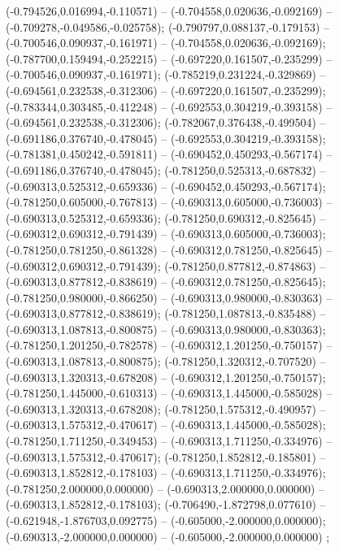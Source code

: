  (-0.794526,0.016994,-0.110571) -- (-0.704558,0.020636,-0.092169) -- (-0.709278,-0.049586,-0.025758);
 (-0.790797,0.088137,-0.179153) -- (-0.700546,0.090937,-0.161971) -- (-0.704558,0.020636,-0.092169);
 (-0.787700,0.159494,-0.252215) -- (-0.697220,0.161507,-0.235299) -- (-0.700546,0.090937,-0.161971);
 (-0.785219,0.231224,-0.329869) -- (-0.694561,0.232538,-0.312306) -- (-0.697220,0.161507,-0.235299);
 (-0.783344,0.303485,-0.412248) -- (-0.692553,0.304219,-0.393158) -- (-0.694561,0.232538,-0.312306);
 (-0.782067,0.376438,-0.499504) -- (-0.691186,0.376740,-0.478045) -- (-0.692553,0.304219,-0.393158);
 (-0.781381,0.450242,-0.591811) -- (-0.690452,0.450293,-0.567174) -- (-0.691186,0.376740,-0.478045);
 (-0.781250,0.525313,-0.687832) -- (-0.690313,0.525312,-0.659336) -- (-0.690452,0.450293,-0.567174);
 (-0.781250,0.605000,-0.767813) -- (-0.690313,0.605000,-0.736003) -- (-0.690313,0.525312,-0.659336);
 (-0.781250,0.690312,-0.825645) -- (-0.690312,0.690312,-0.791439) -- (-0.690313,0.605000,-0.736003);
 (-0.781250,0.781250,-0.861328) -- (-0.690312,0.781250,-0.825645) -- (-0.690312,0.690312,-0.791439);
 (-0.781250,0.877812,-0.874863) -- (-0.690313,0.877812,-0.838619) -- (-0.690312,0.781250,-0.825645);
 (-0.781250,0.980000,-0.866250) -- (-0.690313,0.980000,-0.830363) -- (-0.690313,0.877812,-0.838619);
 (-0.781250,1.087813,-0.835488) -- (-0.690313,1.087813,-0.800875) -- (-0.690313,0.980000,-0.830363);
 (-0.781250,1.201250,-0.782578) -- (-0.690312,1.201250,-0.750157) -- (-0.690313,1.087813,-0.800875);
 (-0.781250,1.320312,-0.707520) -- (-0.690313,1.320313,-0.678208) -- (-0.690312,1.201250,-0.750157);
 (-0.781250,1.445000,-0.610313) -- (-0.690313,1.445000,-0.585028) -- (-0.690313,1.320313,-0.678208);
 (-0.781250,1.575312,-0.490957) -- (-0.690313,1.575312,-0.470617) -- (-0.690313,1.445000,-0.585028);
 (-0.781250,1.711250,-0.349453) -- (-0.690313,1.711250,-0.334976) -- (-0.690313,1.575312,-0.470617);
 (-0.781250,1.852812,-0.185801) -- (-0.690313,1.852812,-0.178103) -- (-0.690313,1.711250,-0.334976);
 (-0.781250,2.000000,0.000000) -- (-0.690313,2.000000,0.000000) -- (-0.690313,1.852812,-0.178103);
 (-0.706490,-1.872798,0.077610) -- (-0.621948,-1.876703,0.092775) -- (-0.605000,-2.000000,0.000000);
 (-0.690313,-2.000000,0.000000) -- (-0.605000,-2.000000,0.000000) ;
